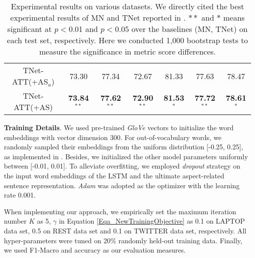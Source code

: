 \documentclass[11pt,a4paper]{article}
\begin{document}
\begin{table*}[t]
\begin{tabular}{ c|c|c|c|c|c|c }
TNet-ATT(+AS$_a$)      & 73.30 & 77.34 & 72.67 & 81.33 & 77.63 & 78.47 \\
TNet-ATT(+AS)          & \textbf{73.84}$^{**}$ & \textbf{77.62}$^{**}$ & \textbf{72.90}$^{**}$ & \textbf{81.53}$^{*}$ & \textbf{77.72}$^{**}$ & \textbf{78.61}$^{*}$ \\
\hline
\end{tabular}
\caption{\label{Table_OverallResults}
Experimental results on various datasets.
We directly cited the best experimental results of MN and TNet reported in \cite{Wang:ACL2018,Li:ACL2018}.
$\ast\ast$ and $\ast$ means significant at $p<$0.01 and $p<$0.05 over the baselines (MN, TNet) on each test set, respectively.
Here we conducted 1,000 bootstrap tests \cite{Koehn:EMNLP2004} to measure the significance in metric score differences.
}
\end{table*}

\textbf{Training Details}.
We used pre-trained \emph{GloVe} vectors \cite{Pennington:EMNLP2014} to initialize the word embeddings with vector dimension 300.
For out-of-vocabulary words,
we randomly sampled their embeddings from the uniform distribution [-0.25, 0.25],
as implemented in \cite{Kim:EMNLP2014}.
Besides,
we initialized the other model parameters uniformly between [-0.01, 0.01].
To alleviate overfitting,
we employed \emph{dropout} strategy \cite{Hinton:CS2012} on the input word embeddings of the LSTM and the ultimate aspect-related sentence representation.
\emph{Adam} \cite{Kingma:ICLR2015} was adopted as the optimizer with the learning rate 0.001.

When implementing our approach,
we empirically set the maximum iteration number $K$ as 5,
$\gamma$ in Equation \ref{Eqa_NewTrainingObjective} as 0.1 on LAPTOP data set, 0.5 on REST data set and 0.1 on TWITTER data set, respectively.
All hyper-parameters were tuned on 20\% randomly held-out training data.
Finally,
we used F1-Macro and accuracy as our evaluation measures.
\end{document}
